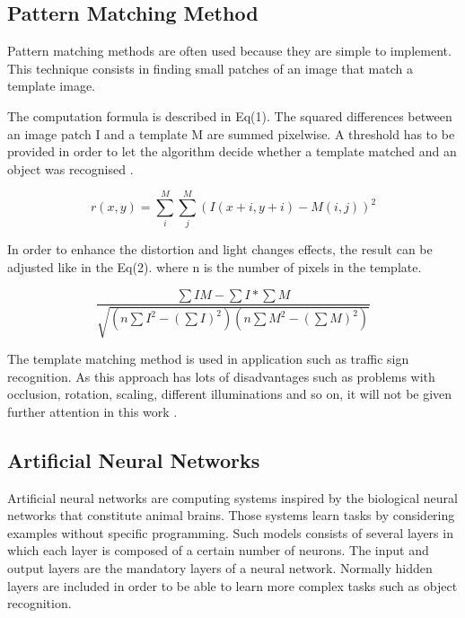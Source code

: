 \documentclass[9pt,shortpaper,twoside,web]{ieeecolor}
\begin{document}
\subsection{Pattern Matching Method}
Pattern matching methods are often used because they are simple to implement. This technique consists in finding small patches of an image that match a template image.

The computation formula is described in Eq(1). The squared differences between an image patch I and a template M are summed pixelwise. A threshold has to be provided in order to let the algorithm decide whether a template matched and an object was recognised \cite{b1}. 

\begin{equation} 
\label{eq1}
r(x,y) = \sum\limits_{i}^M \sum\limits_{j}^M (I (x + i, y + i) - M(i, j))^2
\end{equation}

In order to enhance the distortion and light changes effects, the result can be adjusted like in the Eq(2). where n is the number of pixels in the template.

\begin{equation}
\label{eq2}
\frac{ \sum IM - \sum I * \sum M}
{ \sqrt{(n \sum I^2 - ( \sum I)^2) (n \sum M^2 - ( \sum M)^2)}}
\end{equation}

The template matching method is used in application such as traffic sign recognition. As this approach has lots of disadvantages such as problems with
occlusion, rotation, scaling, different illuminations and so on, it will not be given further attention in this work \cite{b1}.

\subsection{Artificial Neural Networks}
Artificial neural networks are computing systems inspired by the biological neural networks that constitute animal brains. Those systems learn tasks by considering examples without specific programming. Such models consists of several layers in which each layer is composed of a certain number of neurons. The input and output layers are the mandatory layers of a neural network. Normally hidden layers are included in order to be able to learn more complex tasks such as object recognition.
\end{document}
